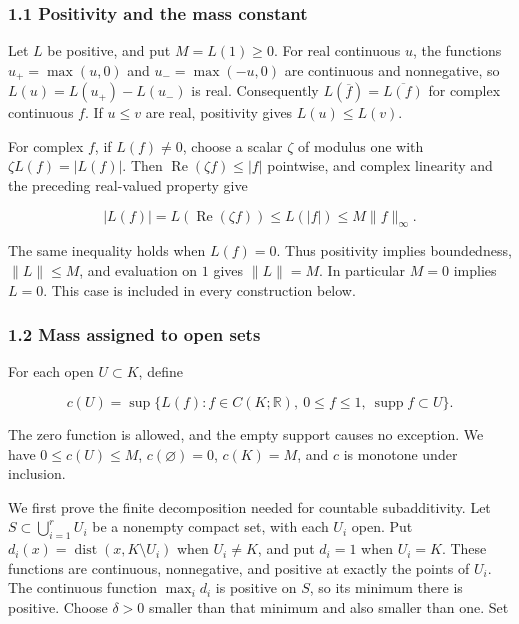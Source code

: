 \documentclass[
  11pt,
]{article}
\begin{document}
\subsubsection{1.1 Positivity and the mass
constant}\label{positivity-and-the-mass-constant}

Let \(L\) be positive, and put \(M=L(1)\geq0\). For real continuous
\(u\), the functions \(u_+=\max(u,0)\) and \(u_-=\max(-u,0)\) are
continuous and nonnegative, so \(L(u)=L(u_+)-L(u_-)\) is real.
Consequently \(L(\overline f)=\overline{L(f)}\) for complex continuous
\(f\). If \(u\leq v\) are real, positivity gives \(L(u)\leq L(v)\).

For complex \(f\), if \(L(f)\ne0\), choose a scalar \(\zeta\) of modulus
one with \(\zeta L(f)=|L(f)|\). Then
\(\operatorname{Re}(\zeta f)\leq|f|\) pointwise, and complex linearity
and the preceding real-valued property give

\[
|L(f)|=L(\operatorname{Re}(\zeta f))\leq L(|f|)\leq M\|f\|_\infty.
\tag{PR1}
\]

The same inequality holds when \(L(f)=0\). Thus positivity implies
boundedness, \(\|L\|\leq M\), and evaluation on \(1\) gives \(\|L\|=M\).
In particular \(M=0\) implies \(L=0\). This case is included in every
construction below.

\subsubsection{1.2 Mass assigned to open
sets}\label{mass-assigned-to-open-sets}

For each open \(U\subset K\), define

\[
c(U)=\sup\{L(f):f\in C(K;\mathbb R),\ 0\leq f\leq1,\ \operatorname{supp}f\subset U\}.
\tag{PR2}
\]

The zero function is allowed, and the empty support causes no exception.
We have \(0\leq c(U)\leq M\), \(c(\varnothing)=0\), \(c(K)=M\), and
\(c\) is monotone under inclusion.

We first prove the finite decomposition needed for countable
subadditivity. Let \(S\subset\bigcup_{i=1}^rU_i\) be a nonempty compact
set, with each \(U_i\) open. Put
\(d_i(x)=\operatorname{dist}(x,K\setminus U_i)\) when \(U_i\ne K\), and
put \(d_i=1\) when \(U_i=K\). These functions are continuous,
nonnegative, and positive at exactly the points of \(U_i\). The
continuous function \(\max_i d_i\) is positive on \(S\), so its minimum
there is positive. Choose \(\delta>0\) smaller than that minimum and
also smaller than one. Set
\end{document}
